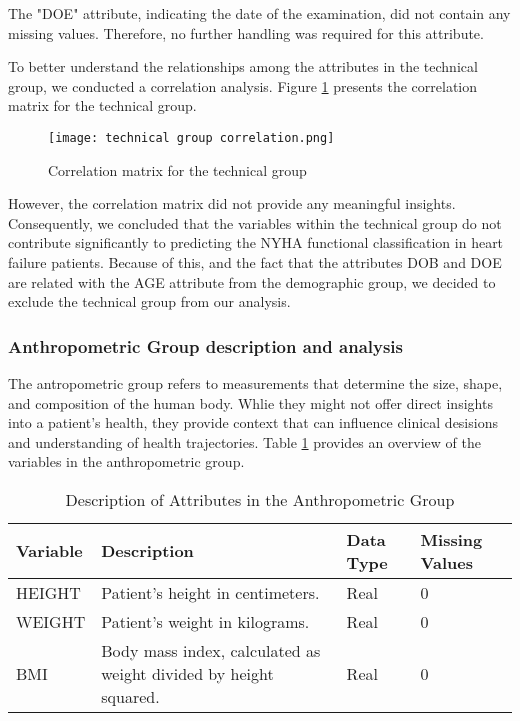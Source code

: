         The "DOE" attribute, indicating the date of the examination, did not contain any missing values. Therefore, no further handling was required for this attribute.

        To better understand the relationships among the attributes in the technical group, we conducted a correlation analysis. Figure \ref{fig:technical group correlation} presents the correlation matrix for the technical group.

        \begin{figure}[H]
        \centering
        \texttt{[image: technical group correlation.png]}
        \caption{Correlation matrix for the technical group}
        \label{fig:technical group correlation}
        \end{figure}

        However, the correlation matrix did not provide any meaningful insights. Consequently, we concluded that the variables within the technical group do not contribute significantly to predicting the NYHA functional classification in heart failure patients. Because of this, and the fact that the attributes DOB and DOE are related with the AGE attribute from the demographic group, we decided to exclude the technical group from our analysis.

\subsubsection{Anthropometric Group description and analysis}

        The antropometric group refers to measurements that determine the size, shape, and composition of the human body. Whlie they might not offer direct insights into a patient's health, they provide context that can influence clinical desisions and understanding of health trajectories. Table \ref{tab:anthropometric group attributes} provides an overview of the variables in the anthropometric group.

        \begin{table}[H]
          \centering
          \caption{Description of Attributes in the Anthropometric Group}
          \label{tab:anthropometric group attributes}
          \begin{adjustbox}{center}
          \begin{tabular}{|p{2.6cm}|p{10cm}|p{1.6cm}|p{1.8cm}|}
          \hline
          \textbf{Variable} &
          \textbf{Description} &
          \textbf{Data Type} &
          \textbf{Missing Values} \\ \hline
          HEIGHT & Patient's height in centimeters. & Real & 0 \\
          WEIGHT & Patient's weight in kilograms. & Real & 0 \\
          BMI & Body mass index, calculated as weight divided by height squared. & Real & 0 \\
          \hline
          \end{tabular}
          \end{adjustbox}
        \end{table}

